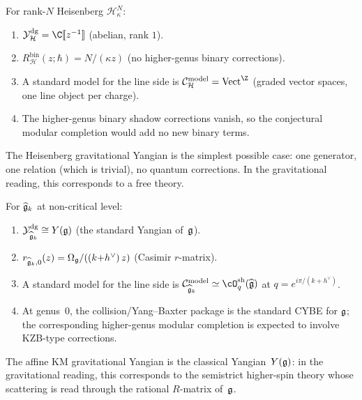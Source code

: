 \begin{computation}
For rank-$N$ Heisenberg $\mathcal{H}^N_\kappa$:
\begin{enumerate}[label=\textup{(\roman*)}]
\item $\Ydg_{\mathcal{H}} = \C[\![z^{-1}]\!]$
 (abelian, rank $1$).
\item $R^{\mathrm{bin}}_{\mathcal{H}}(z;\hbar) = N/(\kappa z)$
 (no higher-genus binary corrections).
\item A standard model for the line side is
 $\cC_{\mathcal{H}}^{\mathrm{model}} = \mathrm{Vect}^{\Z}$
 (graded vector spaces, one line object per charge).
\item The higher-genus binary shadow corrections vanish, so the
 conjectural modular completion would add no new binary terms.
\end{enumerate}
The Heisenberg gravitational Yangian is the simplest possible
case: one generator, one relation (which is trivial), no quantum
corrections. In the gravitational reading, this corresponds to a free
theory.
\end{computation}

\begin{computation}
\label{comp:thqg-V-affine-yangian}
For $\widehat{\mathfrak{g}}_k$ at non-critical level:
\begin{enumerate}[label=\textup{(\roman*)}]
\item $\mathcal{Y}^{\mathrm{dg}}_{\widehat{\mathfrak{g}}_k} \cong Y(\mathfrak{g})$
 (the standard Yangian of~$\mathfrak{g}$).
\item $r_{\widehat{\mathfrak{g}}_k,0}(z) = \Omega_{\mathfrak{g}}/((k{+}h^\vee)\,z)$
 (Casimir $r$-matrix).
\item A standard model for the line side is
 $\cC_{\widehat{\fg}_k}^{\mathrm{model}} \simeq
 \cO^{\mathrm{sh}}_q(\widehat{\fg})$
 at $q = e^{i\pi/(k+h^\vee)}$.
\item At genus~$0$, the collision/Yang--Baxter package is the
 standard CYBE for $\mathfrak{g}$; the corresponding higher-genus modular
 completion is expected to involve KZB-type corrections.
\end{enumerate}
The affine KM gravitational Yangian is the classical Yangian~$Y(\mathfrak{g})$:
in the gravitational reading, this corresponds to the semistrict
higher-spin theory whose scattering is read through the rational
$R$-matrix of~$\mathfrak{g}$.
\end{computation}

